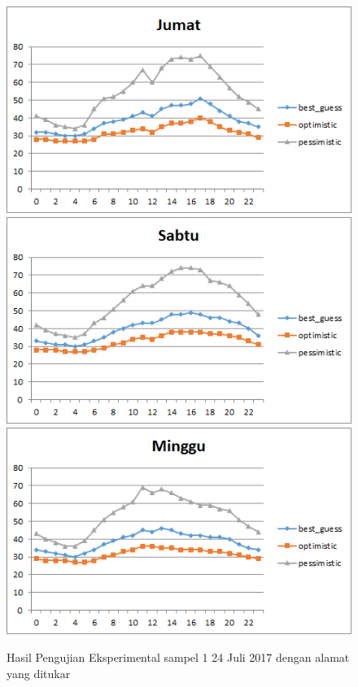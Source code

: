 \begin{figure}[H]
				\centering		
				\includegraphics[]{Gambar/jumatsampel124072017reverse.png}
				\includegraphics[]{Gambar/sabtusampel124072017reverse.png}
				\includegraphics[]{Gambar/minggusampel124072017reverse.png}
				\caption[Hasil Pengujian Eksperimental]{Hasil Pengujian Eksperimental sampel 1 24 Juli 2017 dengan alamat yang ditukar}
				\label{fig:eksperimentalsampel124072017reverse}
\end{figure}


